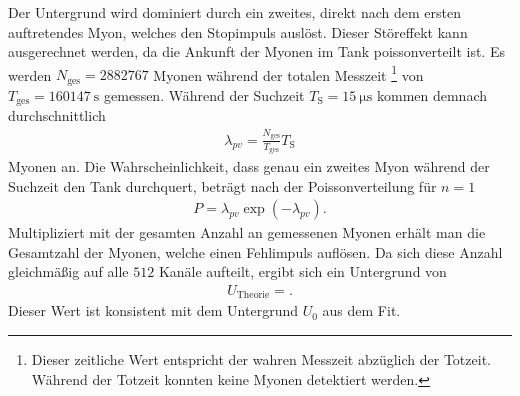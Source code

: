 Der Untergrund wird dominiert durch ein zweites, direkt nach dem ersten auftretendes Myon, welches den Stopimpuls auslöst.
Dieser Störeffekt kann ausgerechnet werden, da die Ankunft der Myonen im Tank poissonverteilt ist.
Es werden $N_\text{ges} = \num{2882767}$ Myonen während der totalen Messzeit \footnote{Dieser zeitliche Wert entspricht der wahren Messzeit abzüglich der Totzeit. Während der Totzeit konnten keine Myonen detektiert werden.} von $T_\text{ges} = \SI{160147}{\second}$ gemessen.
Während der Suchzeit $T_\text{S} = \SI{15}{\micro\second}$ kommen demnach durchschnittlich
\begin{align*}
  \lambda_{pv} = \frac{N_\text{ges}}{T_\text{ges}} T_\text{S}
\end{align*}
Myonen an.
Die Wahrscheinlichkeit, dass genau ein zweites Myon während der Suchzeit den Tank durchquert, beträgt nach der Poissonverteilung für $n=1$
\begin{align*}
  P = \lambda_{pv} \exp{\left(-\lambda_{pv}\right)}.
\end{align*}
Multipliziert mit der gesamten Anzahl an gemessenen Myonen erhält man die Gesamtzahl der Myonen, welche einen Fehlimpuls auflösen.
Da sich diese Anzahl gleichmäßig auf alle $\num{512}$ Kanäle aufteilt, ergibt sich ein Untergrund von
\begin{align*}
  U_{\text{Theorie}} = .
\end{align*}
Dieser Wert ist konsistent mit dem Untergrund $U_0$ aus dem Fit.
